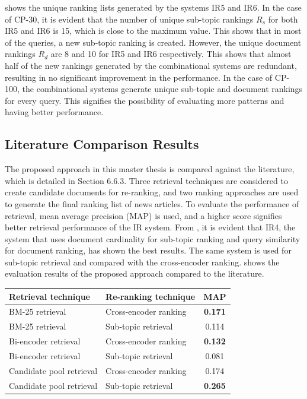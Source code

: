  shows the unique ranking lists generated by the systems IR5 and IR6. In the case of CP-30, it is evident that the number of unique sub-topic rankings $R_s$ for both IR5 and IR6 is 15, which is close to the maximum value. This shows that in most of the queries, a new sub-topic ranking is created. However, the unique document rankings $R_d$ are 8 and 10 for IR5 and IR6 respectively. This shows that almost half of the new rankings generated by the combinational systems are redundant, resulting in no significant improvement in the performance. In the case of CP-100, the combinational systems generate unique sub-topic and document rankings for every query. This signifies the possibility of evaluating more patterns and having better performance.

\subsection{Literature Comparison Results}



The proposed approach in this master thesis is compared against the literature, which is detailed in Section 6.6.3. Three retrieval techniques are considered to create candidate documents for re-ranking, and two ranking approaches are used to generate the final ranking list of news articles. To evaluate the performance of retrieval, mean average precision (MAP) is used, and a higher score signifies better retrieval performance of the IR system. From , it is evident that IR4, the system that uses document cardinality for sub-topic ranking and query similarity for document ranking, has shown the best results. The same system is used for sub-topic retrieval and compared with the cross-encoder ranking.  shows the evaluation results of the proposed approach compared to the literature.

\begin{center}
	\label{tab:literature_results}
	\begin{tabularx}{0.8\textwidth}{|Y|Y|c|}
		\hline
		Retrieval technique & Re-ranking technique & MAP \\
		\hline
		BM-25 retrieval & Cross-encoder ranking & \textbf{0.171}  \\
		\hline
		BM-25 retrieval  & Sub-topic retrieval & 0.114 \\
		\hline
		\hline
		Bi-encoder retrieval  & Cross-encoder ranking & \textbf{0.132} \\
		\hline
		Bi-encoder retrieval  & Sub-topic retrieval & 0.081 \\
		\hline
		\hline
		Candidate pool retrieval  & Cross-encoder ranking & 0.174 \\
		\hline
		Candidate pool retrieval & Sub-topic retrieval &  \textbf{0.265} \\
		\hline
	\end{tabularx}
\end{center}


